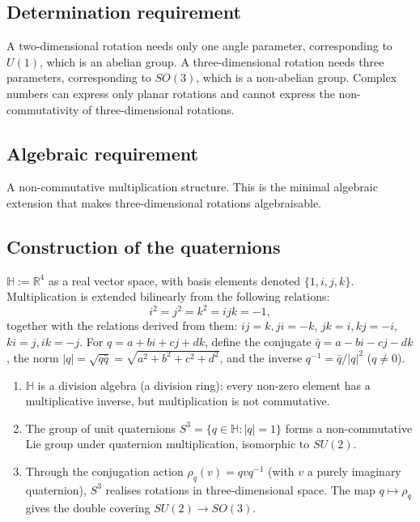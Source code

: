 \subsection{\texorpdfstring{Determination requirement}{Determination requirement}}

A two-dimensional rotation needs only one angle parameter, corresponding to $U(1)$, which is an abelian group. A three-dimensional rotation needs three parameters, corresponding to $SO(3)$, which is a non-abelian group. Complex numbers can express only planar rotations and cannot express the non-commutativity of three-dimensional rotations.

\subsection{\texorpdfstring{Algebraic requirement}{Algebraic requirement}}

A non-commutative multiplication structure. This is the minimal algebraic extension that makes three-dimensional rotations algebraisable.

\subsection{\texorpdfstring{Construction of the quaternions}{Construction of the quaternions}}

\begin{definition}\label{def:quaternion_construction}
$\mathbb{H} := \mathbb{R}^4$ as a real vector space, with basis elements denoted $\{1,i,j,k\}$. Multiplication is extended bilinearly from the following relations:
\[
i^2 = j^2 = k^2 = ijk = -1,
\]
together with the relations derived from them: $ij = k, ji = -k$, $jk = i, kj = -i$, $ki = j, ik = -j$.
For $q = a + bi + cj + dk$, define the conjugate $\bar{q} = a - bi - cj - dk$, the norm $|q| = \sqrt{q\bar{q}} = \sqrt{a^2+b^2+c^2+d^2}$, and the inverse $q^{-1} = \bar{q}/|q|^2$ ($q \neq 0$).
\end{definition}

\begin{proposition}\label{prop:quaternion_properties}
\begin{enumerate}[label=(\roman*)]
    \item $\mathbb{H}$ is a division algebra (a division ring): every non-zero element has a multiplicative inverse, but multiplication is not commutative.
    \item The group of unit quaternions $S^3 = \{q \in \mathbb{H} : |q| = 1\}$ forms a non-commutative Lie group under quaternion multiplication, isomorphic to $SU(2)$.
    \item Through the conjugation action $\rho_q(v) = q v q^{-1}$ (with $v$ a purely imaginary quaternion), $S^3$ realises rotations in three-dimensional space. The map $q \mapsto \rho_q$ gives the double covering $SU(2) \to SO(3)$.
\end{enumerate}
\end{proposition}

